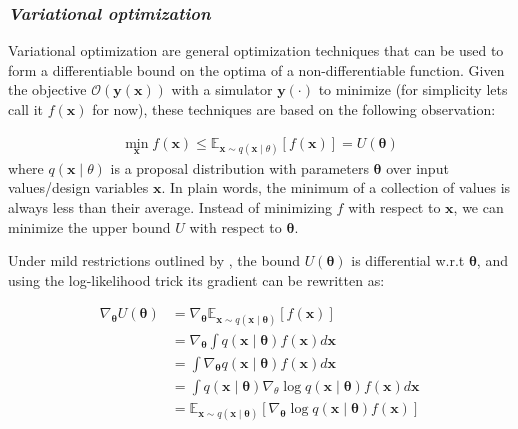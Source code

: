 \subsubsection{\emph{Variational optimization}}
%
 Variational optimization are general optimization techniques that can be used to form a differentiable bound on the optima of a non-differentiable function. Given the objective $\mathcal{O}(\bm{y}(\bm{x}))$ with a simulator $\bm{y}(\cdot)$ to minimize (for simplicity lets call it $f(\bm{x})$ for now), these techniques are based on the following observation:

\begin{align}
    \min _{\boldsymbol{x}} f(\boldsymbol{x}) \leq \mathbb{E}_{\boldsymbol{x} \sim q(\boldsymbol{x} \mid \theta)}[f(\boldsymbol{x})]=U(\boldsymbol{\theta})
\end{align}
 where $q(\boldsymbol{x} \mid \theta)$ is a proposal distribution with parameters $\bm{\theta}$ over input values/design variables $\bm{x}$. In plain words, the minimum of a collection of values is always less than their average. Instead of minimizing $f$ with respect to $\bm{x}$, we can minimize the upper bound $U$ with respect to $\bm{\theta}$.
 
 Under mild restrictions outlined by \cite{staines_variational_2012}, the bound $U(\boldsymbol{ \theta})$ is differential w.r.t $\bm{\theta}$, and using the log-likelihood trick its gradient can be rewritten as:

\begin{align}\label{eq:grad_estimator}
\nabla_{\boldsymbol{\theta}} U(\boldsymbol{\theta}) &=\nabla_{\boldsymbol{\theta}} \mathbb{E}_{\boldsymbol{x} \sim q(\boldsymbol{x} \mid \boldsymbol{\theta})}[f(\boldsymbol{x})] \nonumber \\
&=\nabla_{\boldsymbol{\theta}} \int q(\boldsymbol{x} \mid \boldsymbol{\theta}) f(\boldsymbol{x}) d \boldsymbol{x} 
\nonumber\\
&=\int \nabla_{\boldsymbol{\theta}} q(\boldsymbol{x} \mid \boldsymbol{\theta}) f(\boldsymbol{x}) d \boldsymbol{x} 
\nonumber \\
&=\int q(\boldsymbol{x} \mid \boldsymbol{\theta}) \nabla_\theta \log q(\boldsymbol{x} \mid \boldsymbol{\theta}) f(\boldsymbol{x}) d \boldsymbol{x} 
\nonumber \\
&=\mathbb{E}_{\boldsymbol{x} \sim q(\boldsymbol{x} \mid \boldsymbol{\theta})}\left[\nabla_{\boldsymbol{\theta}} \log q(\boldsymbol{x} \mid \boldsymbol{\theta}) f(\boldsymbol{x})\right]
\end{align}

